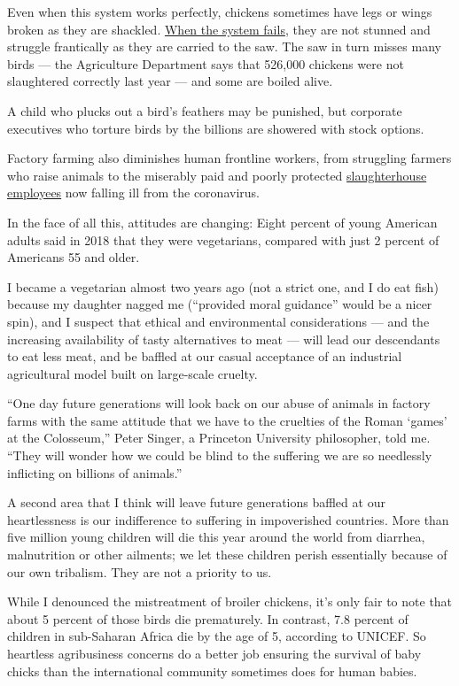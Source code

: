 Even when this system works perfectly, chickens sometimes have legs or
wings broken as they are shackled.
\href{https://youtu.be/IayFKuxqODo}{When the system fails}, they are not
stunned and struggle frantically as they are carried to the saw. The saw
in turn misses many birds --- the Agriculture Department says that
526,000 chickens were not slaughtered correctly last year --- and some
are boiled alive.

A child who plucks out a bird's feathers may be punished, but corporate
executives who torture birds by the billions are showered with stock
options.

Factory farming also diminishes human frontline workers, from struggling
farmers who raise animals to the miserably paid and poorly protected
\href{https://foodispower.org/human-labor-slavery/slaughterhouse-workers/\#:~:text=Slaughtering\%20animals\%20and\%20processing\%20their,facilities\%20employ\%20over\%20500\%2C000\%20workers.}{slaughterhouse
employees} now falling ill from the coronavirus.

In the face of all this, attitudes are changing: Eight percent of young
American adults said in 2018 that they were vegetarians, compared with
just 2 percent of Americans 55 and older.

I became a vegetarian almost two years ago (not a strict one, and I do
eat fish) because my daughter nagged me (``provided moral guidance''
would be a nicer spin), and I suspect that ethical and environmental
considerations --- and the increasing availability of tasty alternatives
to meat --- will lead our descendants to eat less meat, and be baffled
at our casual acceptance of an industrial agricultural model built on
large-scale cruelty.

``One day future generations will look back on our abuse of animals in
factory farms with the same attitude that we have to the cruelties of
the Roman `games' at the Colosseum,'' Peter Singer, a Princeton
University philosopher, told me. ``They will wonder how we could be
blind to the suffering we are so needlessly inflicting on billions of
animals.''

A second area that I think will leave future generations baffled at our
heartlessness is our indifference to suffering in impoverished
countries. More than five million young children will die this year
around the world from diarrhea, malnutrition or other ailments; we let
these children perish essentially because of our own tribalism. They are
not a priority to us.

While I denounced the mistreatment of broiler chickens, it's only fair
to note that about 5 percent of those birds die prematurely. In
contrast, 7.8 percent of children in sub-Saharan Africa die by the age
of 5, according to UNICEF. So heartless agribusiness concerns do a
better job ensuring the survival of baby chicks than the international
community sometimes does for human babies.

